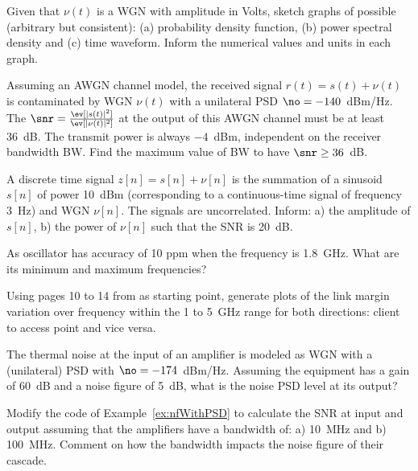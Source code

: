 \begin{exercises}

\item Given that $\nu(t)$ is  a WGN with amplitude in Volts, sketch graphs of possible (arbitrary but consistent): (a) probability density function, (b) power spectral density and (c) time waveform. Inform the numerical values and units in each graph.

\item Assuming an AWGN channel model, the received signal $r(t) = s(t) + \nu(t)$ is contaminated by WGN $\nu(t)$ with a unilateral PSD $\no=-140$~dBm/Hz.
The $\snr = \frac{\ev[|s(t)|^2]}{\ev[|\nu(t)|^2]}$ at the output of this AWGN channel must be at least 36~dB. The transmit power is always $-4$~dBm, independent on the receiver bandwidth BW. Find the maximum value of BW to have $\snr \ge 36$~dB.

\item A discrete time signal $z[n]=s[n]+\nu[n]$ is the summation of a sinusoid $s[n]$ of power 10~dBm (corresponding to a continuous-time signal of frequency 3~Hz) and WGN $\nu[n]$. The signals are uncorrelated. Inform: a) the amplitude of $s[n]$, b) the power of $\nu[n]$ such that the SNR is 20~dB.

\item As oscillator has accuracy of 10 ppm when the frequency is 1.8~GHz. What are its minimum and maximum frequencies?

\item Using pages 10 to 14 from  as starting point, generate plots of the link margin variation over frequency within the 1 to 5~GHz range for both directions: client to access point and vice versa.

\item The thermal noise at the input of an amplifier is modeled as WGN with a (unilateral) PSD with $\no = -174$~dBm/Hz. Assuming the equipment has a gain of 60~dB and a noise figure of 5~dB, what is the noise PSD level at its output?

\item Modify the code of Example~\ref{ex:nfWithPSD} to calculate the SNR at input and output assuming that the amplifiers have a bandwidth of: a) 10~MHz and b) 100~MHz. Comment on how the bandwidth impacts the noise figure of their cascade.


\end{exercises}
